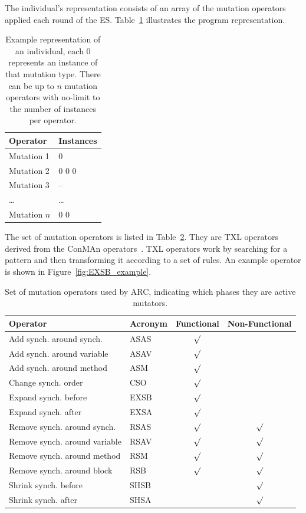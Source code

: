\documentclass[10pt, conference, compsocconf]{IEEEtran}
\begin{document}
The individual's representation consists of an array of the mutation 
operators applied each round of the ES. Table~\ref{tbl:individual_representation} 
illustrates the program representation.

\begin{table}[!h]
\begin{center}
\begin{tabular}{|l|l|}
\hline
\textbf{Operator} &
\textbf{Instances}
\\\hline
Mutation 1 & 0
\\\hline
Mutation 2 & 0 0 0
\\\hline
Mutation 3 & --
\\\hline
\ldots & \ldots
\\\hline
Mutation $n$ & 0 0
\\\hline
\end{tabular}
\caption{Example representation of an individual, each 0 represents
an instance of that mutation type. There can be up to $n$ mutation 
operators with no-limit to the number of instances per operator.}
\label{tbl:individual_representation}
\end{center}
\end{table}

The set of mutation operators is listed in Table~\ref{tbl:operators}. They are 
TXL operators derived from the ConMAn operators~\cite{BCD06}. TXL operators  work by searching for a pattern and then transforming it according to a set of rules.  An example operator is shown in Figure~\ref{fig:EXSB_example}.

\begin{table}
\begin{center}
\begin{tabular}{|l|l|c|c|}
\hline
\textbf{Operator} &
\textbf{Acronym} &
\textbf{Functional} &
\textbf{Non-Functional}
\\\hline
Add synch. around synch. & ASAS & $\surd$ &
\\\hline
Add synch. around variable & ASAV & $\surd$ &
\\\hline
Add synch. around method & ASM & $\surd$ &
\\\hline
Change synch. order & CSO & $\surd$ &
\\\hline
Expand synch. before & EXSB & $\surd$ &
\\\hline
Expand synch. after & EXSA & $\surd$ &
\\\hline
Remove synch. around synch. & RSAS & $\surd$ & $\surd$
\\\hline
Remove synch. around variable & RSAV & $\surd$ & $\surd$
\\\hline
Remove synch. around method & RSM & $\surd$ & $\surd$
\\\hline
Remove synch. around block & RSB & $\surd$ & $\surd$
\\\hline
Shrink synch. before & SHSB & & $\surd$
\\\hline
Shrink synch. after & SHSA & & $\surd$
\\\hline
\end{tabular}
\caption{Set of mutation operators used by ARC, indicating which phases they
are active mutators.}
\label{tbl:operators}
\end{center}
\end{table}
\end{document}
